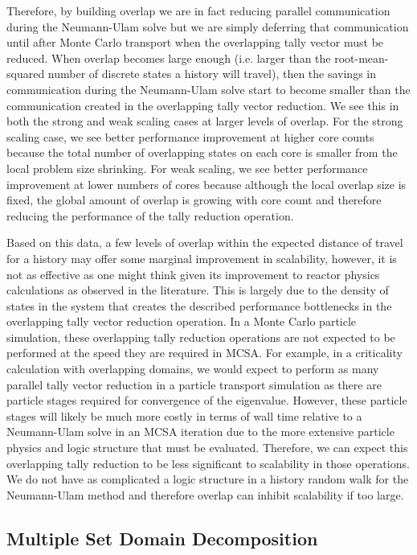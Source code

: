 Therefore, by building overlap we are in fact reducing parallel
communication during the Neumann-Ulam solve but we are simply
deferring that communication until after Monte Carlo transport when
the overlapping tally vector must be reduced. When overlap becomes
large enough (i.e. larger than the root-mean-squared number of
discrete states a history will travel), then the savings in
communication during the Neumann-Ulam solve start to become smaller
than the communication created in the overlapping tally vector
reduction. We see this in both the strong and weak scaling cases at
larger levels of overlap. For the strong scaling case, we see better
performance improvement at higher core counts because the total number
of overlapping states on each core is smaller from the local problem
size shrinking. For weak scaling, we see better performance
improvement at lower numbers of cores because although the local
overlap size is fixed, the global amount of overlap is growing with
core count and therefore reducing the performance of the tally
reduction operation. 

Based on this data, a few levels of overlap within the expected
distance of travel for a history may offer some marginal improvement
in scalability, however, it is not as effective as one might think
given its improvement to reactor physics calculations as observed in
the literature. This is largely due to the density of states in the
system that creates the described performance bottlenecks in the
overlapping tally vector reduction operation. In a Monte Carlo
particle simulation, these overlapping tally reduction operations are
not expected to be performed at the speed they are required in
MCSA. For example, in a criticality calculation with overlapping
domains, we would expect to perform as many parallel tally vector
reduction in a particle transport simulation as there are particle
stages required for convergence of the eigenvalue. However, these
particle stages will likely be much more costly in terms of wall time
relative to a Neumann-Ulam solve in an MCSA iteration due to the more
extensive particle physics and logic structure that must be
evaluated. Therefore, we can expect this overlapping tally reduction
to be less significant to scalability in those operations. We do not
have as complicated a logic structure in a history random walk for the
Neumann-Ulam method and therefore overlap can inhibit scalability if
too large.

\clearpage

\subsection{Multiple Set Domain Decomposition}
\label{subsec:ms_decomposition}

